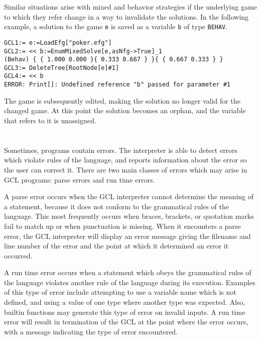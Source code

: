 Similar situations arise with mixed and behavior strategies if the
underlying game to which they refer change in a way to invalidate the
solutions.  In the following example, a solution to the game \verb+e+
is saved as a variable \verb+b+ of type \verb+BEHAV+.  

\begin{verbatim}
GCL1:= e:=LoadEfg["poker.efg"]
GCL2:= << b:=EnumMixedSolve[e,asNfg->True]_1
(Behav) { { 1.000 0.000 }{ 0.333 0.667 } }{ { 0.667 0.333 } }
GCL3:= DeleteTree[RootNode[e]#1]
GCL4:= << b
ERROR: Print[]: Undefined reference "b" passed for parameter #1
\end{verbatim}

The game is subsequently edited, making the solution no longer valid
for the changed game.  At this point the solution becomes an orphan,
and the variable that refers to it is unassigned.  

\section{}

Sometimes, programs contain errors.  The interpreter is able to detect
errors which violate rules of the language, and reports information
about the error so the user can correct it.  There are two main
classes of errors which may arise in GCL programs: parse errors and
run time errors.

A parse error occurs when the GCL interpreter cannot determine the
meaning of a statement, because it does not conform to the grammatical
rules of the language.  This most frequently occurs when braces,
brackets, or quotation marks fail to match up or when punctuation is
missing.  When it encounters a parse error, the GCL interpreter will
display an error message giving the filename and line number of the
error and the point at which it determined an error it occurred.

A run time error occurs when a statement which obeys the grammatical
rules of the language violates another rule of the language during its
execution.  Examples of this type of error include attempting to use a
variable name which is not defined, and using a value of one type
where another type was expected.  Also, builtin functions may generate
this type of error on invalid inputs.  A run time error will result in
termination of the GCL at the point where the error occurs, with a
message indicating the type of error encountered.

